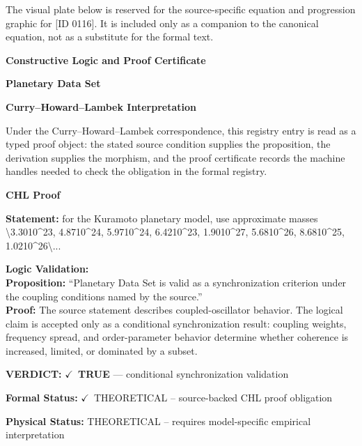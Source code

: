 \begingroup\footnotesize\sloppy
The visual plate below is reserved for the source-specific equation and progression graphic for [ID 0116]. It is included only as a companion to the canonical equation, not as a substitute for the formal text.
\par\endgroup
\ifTZPDarkEdition
{}
\fi

\clearpage
\begingroup\tzpsupportsetup
\noindent\textbf{\fontsize{10.8pt}{12.8pt}\selectfont [ID 0116] Constructive Logic and Proof Certificate}\par
\noindent\textbf{\fontsize{10pt}{12pt}\selectfont Planetary Data Set}\par
\vspace{0.45em}
\begingroup
\footnotesize
\setlength{\parskip}{0.22em}
\setlength{\parindent}{0pt}
\noindent\textbf{Curry--Howard--Lambek Interpretation}\par
Under the Curry--Howard--Lambek correspondence, this registry entry is read as a typed proof
object: the stated source condition supplies the proposition, the derivation supplies the
morphism, and the proof certificate records the machine handles needed to check the obligation
in the formal registry.

\vspace{0.45em}
\noindent\textbf{CHL Proof}\par
\textbf{Statement:} for the Kuramoto planetary model, use approximate masses \textbackslash{}3.3010\textasciicircum{}23, 4.8710\textasciicircum{}24,
5.9710\textasciicircum{}24, 6.4210\textasciicircum{}23, 1.9010\textasciicircum{}27, 5.6810\textasciicircum{}26, 8.6810\textasciicircum{}25, 1.0210\textasciicircum{}26\textbackslash{}...

\textbf{Logic Validation:}\\
\textbf{Proposition:} ``Planetary Data Set is valid as a synchronization criterion under the coupling conditions
named by the source.''\\
\textbf{Proof:} The source statement describes coupled-oscillator behavior. The logical claim is
accepted only as a conditional synchronization result: coupling weights, frequency
spread, and order-parameter behavior determine whether coherence is increased, limited,
or dominated by a subset.

\textbf{VERDICT:} \ensuremath{\checkmark}\ \textbf{TRUE} --- conditional synchronization validation

\textbf{Formal Status:} \ensuremath{\checkmark}\ THEORETICAL -- source-backed CHL proof obligation

\textbf{Physical Status:} THEORETICAL -- requires model-specific empirical interpretation
\par\vspace{0.45em}
\par
\ifTZPDarkEdition
{}
\fi
\endgroup
\endgroup
